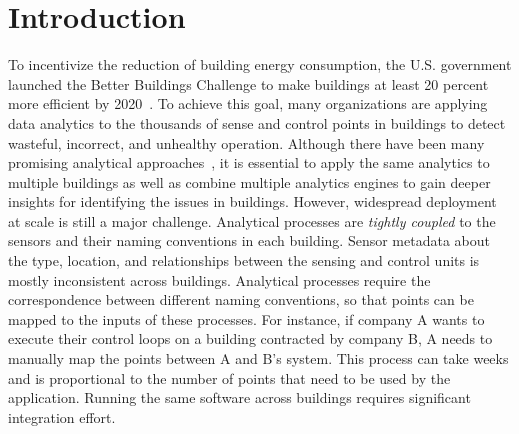 \section{Introduction}

To incentivize the reduction of building energy consumption, the U.S. government 
launched the Better Buildings Challenge to make buildings at least 20 percent 
more efficient by 2020~\cite{doe2013better}. To achieve this goal, many organizations 
are applying data analytics to the thousands of sense and control points in 
buildings to detect wasteful, incorrect, and unhealthy operation.  
Although there have been many promising analytical approaches~\cite{}, it is essential to apply
the same analytics to multiple buildings as well as combine multiple analytics engines to
gain deeper insights for identifying the issues in buildings.
However, widespread deployment at scale is still a major challenge.
Analytical processes are \emph{tightly coupled} to the sensors and their naming conventions in each building. 
Sensor metadata about the type, location, and relationships between the sensing 
and control units is mostly inconsistent across buildings.
Analytical processes require the correspondence between different naming 
conventions, so that points can be mapped to the inputs of these processes.
For instance, if company A wants to execute their 
control loops on a building contracted by company B, A needs to manually 
map the points between A and B's system. This process can take weeks and is proportional 
to the number of points that need to be used by the application. 
Running the same software across buildings requires significant integration effort.




